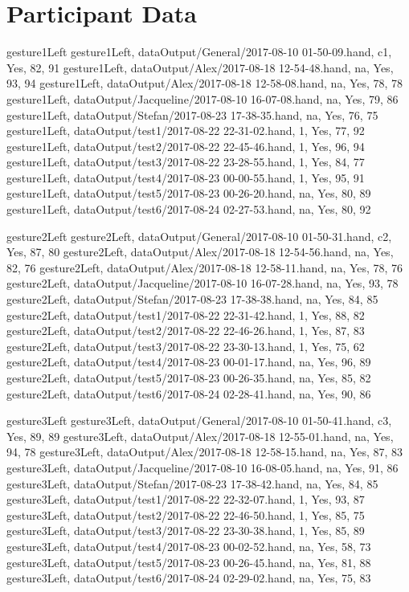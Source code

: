 \chapter{Participant Data}

\label{Appendix_dataAvgs} 
gesture1Left
gesture1Left, dataOutput/General/2017-08-10 01-50-09.hand, c1, Yes, 82, 91
gesture1Left, dataOutput/Alex/2017-08-18 12-54-48.hand, na, Yes, 93, 94
gesture1Left, dataOutput/Alex/2017-08-18 12-58-08.hand, na, Yes, 78, 78
gesture1Left, dataOutput/Jacqueline/2017-08-10 16-07-08.hand, na, Yes, 79, 86
gesture1Left, dataOutput/Stefan/2017-08-23 17-38-35.hand, na, Yes, 76, 75
gesture1Left, dataOutput/test1/2017-08-22 22-31-02.hand, 1, Yes, 77, 92
gesture1Left, dataOutput/test2/2017-08-22 22-45-46.hand, 1, Yes, 96, 94
gesture1Left, dataOutput/test3/2017-08-22 23-28-55.hand, 1, Yes, 84, 77
gesture1Left, dataOutput/test4/2017-08-23 00-00-55.hand, 1, Yes, 95, 91
gesture1Left, dataOutput/test5/2017-08-23 00-26-20.hand, na, Yes, 80, 89
gesture1Left, dataOutput/test6/2017-08-24 02-27-53.hand, na, Yes, 80, 92

gesture2Left
gesture2Left, dataOutput/General/2017-08-10 01-50-31.hand, c2, Yes, 87, 80
gesture2Left, dataOutput/Alex/2017-08-18 12-54-56.hand, na, Yes, 82, 76
gesture2Left, dataOutput/Alex/2017-08-18 12-58-11.hand, na, Yes, 78, 76
gesture2Left, dataOutput/Jacqueline/2017-08-10 16-07-28.hand, na, Yes, 93, 78
gesture2Left, dataOutput/Stefan/2017-08-23 17-38-38.hand, na, Yes, 84, 85
gesture2Left, dataOutput/test1/2017-08-22 22-31-42.hand, 1, Yes, 88, 82
gesture2Left, dataOutput/test2/2017-08-22 22-46-26.hand, 1, Yes, 87, 83
gesture2Left, dataOutput/test3/2017-08-22 23-30-13.hand, 1, Yes, 75, 62
gesture2Left, dataOutput/test4/2017-08-23 00-01-17.hand, na, Yes, 96, 89
gesture2Left, dataOutput/test5/2017-08-23 00-26-35.hand, na, Yes, 85, 82
gesture2Left, dataOutput/test6/2017-08-24 02-28-41.hand, na, Yes, 90, 86

gesture3Left
gesture3Left, dataOutput/General/2017-08-10 01-50-41.hand, c3, Yes, 89, 89
gesture3Left, dataOutput/Alex/2017-08-18 12-55-01.hand, na, Yes, 94, 78
gesture3Left, dataOutput/Alex/2017-08-18 12-58-15.hand, na, Yes, 87, 83
gesture3Left, dataOutput/Jacqueline/2017-08-10 16-08-05.hand, na, Yes, 91, 86
gesture3Left, dataOutput/Stefan/2017-08-23 17-38-42.hand, na, Yes, 84, 85
gesture3Left, dataOutput/test1/2017-08-22 22-32-07.hand, 1, Yes, 93, 87
gesture3Left, dataOutput/test2/2017-08-22 22-46-50.hand, 1, Yes, 85, 75
gesture3Left, dataOutput/test3/2017-08-22 23-30-38.hand, 1, Yes, 85, 89
gesture3Left, dataOutput/test4/2017-08-23 00-02-52.hand, na, Yes, 58, 73
gesture3Left, dataOutput/test5/2017-08-23 00-26-45.hand, na, Yes, 81, 88
gesture3Left, dataOutput/test6/2017-08-24 02-29-02.hand, na, Yes, 75, 83

